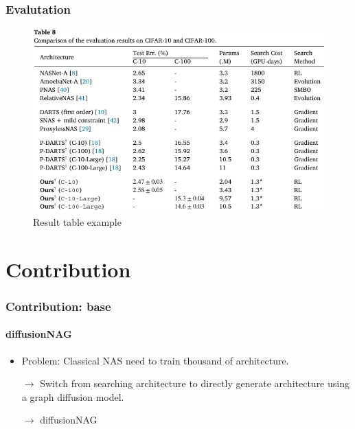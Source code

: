 \documentclass[aspectratio=169,xcolor=dvipsnames]{beamer}
\begin{document}
\begin{frame}
    \frametitle{Evalutation}
    \begin{figure}[htbp]
        \centering
        \includegraphics[height=.7\textheight]{table_random.pdf}
        \caption{Result table example}
    \end{figure}
\end{frame}

\section{Contribution}

\begin{frame}
    \frametitle{Contribution: base}
    \framesubtitle{diffusionNAG}
    \begin{itemize}
        \item Problem: Classical NAS need to train thousand of architecture.
        \item [$\rightarrow$] Switch from searching architecture to directly generate architecture using a graph diffusion model.
        \item [$\rightarrow$] diffusionNAG
    \end{itemize}
\end{frame}
\end{document}
